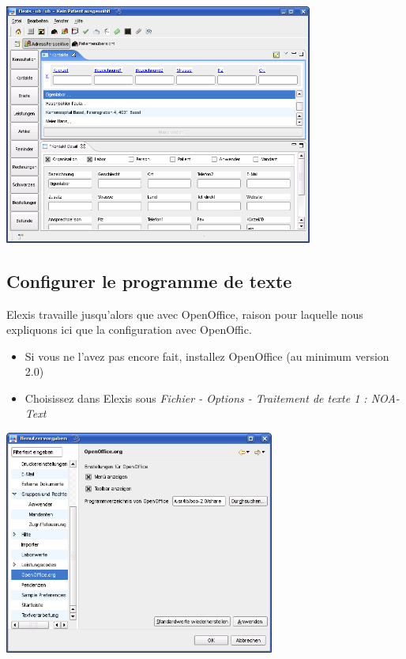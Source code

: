 \includegraphics[width=4in]{images/grundkonfmand1.png}

\subsection{Configurer le programme de texte}

Elexis travaille jusqu'alors que avec OpenOffice, raison pour laquelle nous expliquons ici que la configuration avec OpenOffic.

\begin{itemize}
 \item Si vous ne l'avez pas encore fait, installez OpenOffice (au minimum version 2.0)
 \item Choisissez dans Elexis sous \textit{Fichier - Options - Traitement de texte 1 : NOA-Text}
\end{itemize}

\includegraphics[width=3.5in]{images/grundkonfmand2.png}


